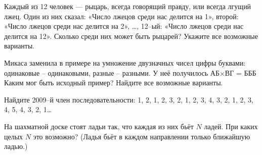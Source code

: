 Каждый из 12 человек — рыцарь, всегда говорящий правду, или всегда лгущий лжец. Один из них сказал: «Число лжецов среди нас делится на 1», второй: «Число лжецов среди нас делится на 2», …, 12–ый: «Число лжецов среди нас делится на 12». Сколько среди них может быть рыцарей? Укажите все возможные варианты.


Микаса заменила в примере на умножение двузначных чисел цифры буквами: одинаковые – одинаковыми, разные – разными. У неё получилось АБ$\times$ВГ = БББ Каким мог быть исходный пример? Найдите все возможные варианты.


 Найдите 2009–й член последовательности: 1, 2, 1, 2, 3, 2, 1, 2, 3, 4, 3, 2, 1, 2, 3, 4, 5, 4, 3, 2, 1…




На шахматной доске стоят ладьи так, что каждая из них бьёт $N$ ладей. При каких целых $N$ это возможно? (Ладья бьёт в каждом направлении только ближайшую ладью.) 

